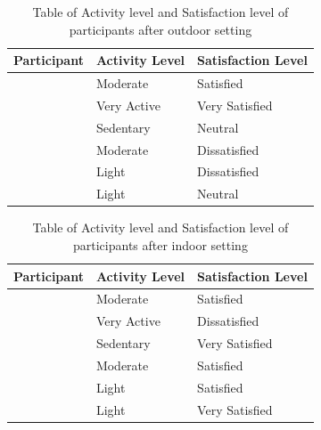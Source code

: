 \documentclass{sigchi}
\begin{document}
\setlength{\arrayrulewidth}{1mm}
\setlength{\tabcolsep}{8pt}
\renewcommand{\arraystretch}{1.25}
{
\begin{table}
\begin{tabularx}{0.45\textwidth}{ 
  | >{\centering\arraybackslash}X 
  | >{\centering\arraybackslash}X 
  | >{\centering\arraybackslash}X | }
\hline
Participant & Activity Level  & Satisfaction Level \\
\hline
1 & Moderate & Satisfied \\
\hline
2 & Very Active & Very Satisfied \\
\hline
3 & Sedentary & Neutral \\
\hline
4 & Moderate & Dissatisfied \\
\hline
5 & Light & Dissatisfied \\
\hline
6 & Light & Neutral \\
\hline
\end{tabularx}
\caption{Table of Activity level and Satisfaction level of participants after outdoor setting}
\label{tab:my_label6}
\end{table}
}

\setlength{\arrayrulewidth}{1mm}
\setlength{\tabcolsep}{18pt}
\renewcommand{\arraystretch}{1.25}
{
\begin{table}
\begin{tabularx}{0.45\textwidth}{ 
  | >{\centering\arraybackslash}X 
  | >{\centering\arraybackslash}X 
  | >{\centering\arraybackslash}X | }
\hline
Participant & Activity Level  & Satisfaction Level \\
\hline
1 & Moderate & Satisfied \\
\hline
2 & Very Active & Dissatisfied \\
\hline
3 & Sedentary & Very Satisfied \\
\hline
4 & Moderate & Satisfied \\
\hline
5 & Light & Satisfied \\
\hline
6 & Light & Very Satisfied \\
\hline
\end{tabularx}
\caption{Table of Activity level and Satisfaction level of participants after indoor setting}
\label{tab:my_label7}
\end{table}
}
\end{document}
